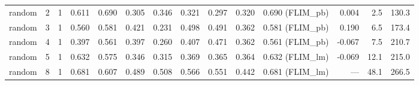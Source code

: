\begin{adjustbox}{max width=\linewidth}
\begin{tabular}{llrrrrrrrrrrrr}
random & 2 & 1 & 0.611 & 0.690 & 0.305 & 0.346 & 0.321 & 0.297 & 0.320 & 0.690 (FLIM\_pb) & 0.004 & 2.5 & 130.3 \\
random & 3 & 1 & 0.560 & 0.581 & 0.421 & 0.231 & 0.498 & 0.491 & 0.362 & 0.581 (FLIM\_pb) & 0.190 & 6.5 & 173.4 \\
random & 4 & 1 & 0.397 & 0.561 & 0.397 & 0.260 & 0.407 & 0.471 & 0.362 & 0.561 (FLIM\_pb) & -0.067 & 7.5 & 210.7 \\
random & 5 & 1 & 0.632 & 0.575 & 0.346 & 0.315 & 0.369 & 0.365 & 0.364 & 0.632 (FLIM\_lm) & -0.069 & 12.1 & 215.0 \\
random & 8 & 1 & 0.681 & 0.607 & 0.489 & 0.508 & 0.566 & 0.551 & 0.442 & 0.681 (FLIM\_lm) & --- & 48.1 & 266.5 \\
\bottomrule
\end{tabular}
\end{adjustbox}
